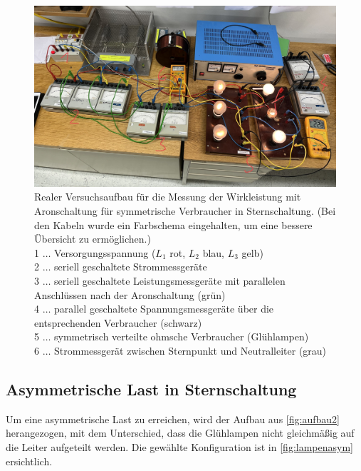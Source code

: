 \documentclass[12pt,english,ngerman]{scrartcl}
\begin{document}
\begin{figure}[H]
	\begin{center}
		\includegraphics[width = \textwidth]{./figures/aufbau2_echt.png}
	\end{center}
	\caption[Realer Versuchsaufbau für die Messung der Wirkleistung mit Aronschaltung für
		symmetrische Verbraucher in Sternschaltung] {Realer Versuchsaufbau für die
		Messung der Wirkleistung mit Aronschaltung für symmetrische Verbraucher in
		Sternschaltung. (Bei den Kabeln wurde ein Farbschema eingehalten, um eine
		bessere Übersicht zu ermöglichen.)                                  \\
		1 \(\dots\) Versorgungsspannung ($L_1$ rot, $L_2$ blau, $L_3$ gelb) \\
		2 \(\dots\) seriell geschaltete Strommessgeräte                     \\
		3 \(\dots\) seriell geschaltete Leistungsmessgeräte mit parallelen Anschlüssen
		nach der Aronschaltung (grün)                                       \\
		4 \(\dots\) parallel geschaltete Spannungsmessgeräte über die entsprechenden
		Verbraucher (schwarz)                                               \\
		5 \(\dots\) symmetrisch verteilte ohmsche Verbraucher (Glühlampen)  \\
		6 \(\dots\) Strommessgerät zwischen Sternpunkt und Neutralleiter (grau)
	}\label{fig:aufbau2_echt}
\end{figure}

\subsection{Asymmetrische Last in Sternschaltung}

Um eine asymmetrische Last zu erreichen, wird der Aufbau aus
\autoref{fig:aufbau2} herangezogen, mit dem Unterschied, dass die Glühlampen
nicht gleichmäßig auf die Leiter aufgeteilt werden. Die gewählte Konfiguration
ist in \autoref{fig:lampenasym} ersichtlich.
\end{document}
